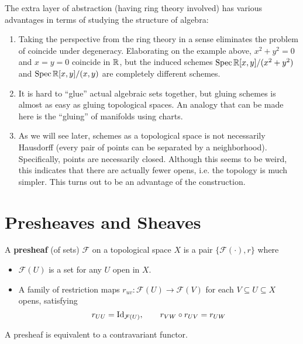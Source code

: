 \documentclass{article}
\begin{document}
\begin{remark}
    The extra layer of abstraction (having ring theory involved) has various advantages in terms of studying the structure of algebra:
    \begin{enumerate}
        \item Taking the perspective from the ring theory in a sense eliminates the problem of coincide under degeneracy. Elaborating on the example above, $x^2 + y^2 = 0$ and $x = y = 0$ coincide in $\mathbb{R}$, but the induced schemes $\operatorname{Spec} \mathbb{R}[x, y]/(x^2 + y^2)$ and $\operatorname{Spec} \mathbb{R}[x, y]/(x, y)$ are completely different schemes.
        \item It is hard to ``glue'' actual algebraic sets together, but gluing schemes is almost as easy as gluing topological spaces. An analogy that can be made here is the ``gluing'' of manifolds using charts.
        \item As we will see later, schemes as a topological space is not necessarily Hausdorff (every pair of points can be separated by a neighborhood). Specifically, points are necessarily closed. Although this seems to be weird, this indicates that there are actually fewer opens, i.e. the topology is much simpler. This turns out to be an advantage of the construction.
    \end{enumerate}
\end{remark}

\section{Presheaves and Sheaves}

\begin{definition}[Presheaf]
    A \textbf{presheaf} (of sets) $\mathcal{F}$ on a topological space $X$ is a pair $\{\mathcal{F}(\cdot), r\}$ where
    \begin{itemize}
        \item $\mathcal{F}(U)$ is a set for any $U$ open in $X$.
        \item A family of restriction maps $r_{uv}: \mathcal{F}(U) \to \mathcal{F}(V)$ for each $V \subseteq U \subseteq X$ opens, satisfying 
        \[
            r_{UU} = \mathrm{Id}_{\mathcal{F}(U)}, \qquad r_{VW} \circ r_{UV} = r_{UW}
        \]
    \end{itemize}
\end{definition}
\nogap
\begin{remark}
    A presheaf is equivalent to a contravariant functor.
\end{remark}
\end{document}
